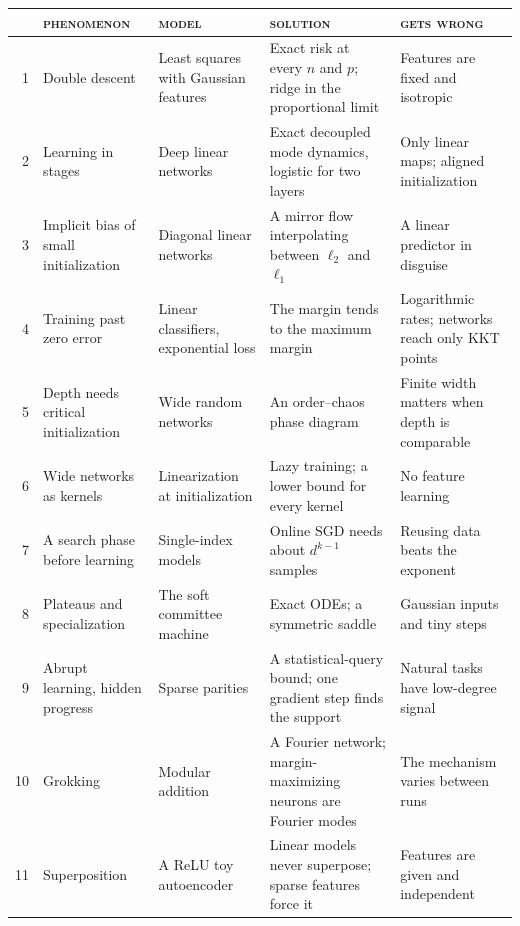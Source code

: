 \begin{refsection}
\begin{table}[p]
\begin{fullwidth}
\centering\small
\renewcommand{\arraystretch}{1.18}
\begin{tabular}{@{}r>{\raggedright\arraybackslash}p{28mm}>{\raggedright\arraybackslash}p{33mm}>{\raggedright\arraybackslash}p{41mm}>{\raggedright\arraybackslash}p{38mm}@{}}
\toprule
& \textsc{phenomenon} & \textsc{model} & \textsc{solution} & \textsc{gets wrong}\\
\midrule
1 & Double descent & Least squares with Gaussian features & Exact risk at every $n$ and $p$; ridge in the proportional limit & Features are fixed and isotropic\\
2 & Learning in stages & Deep linear networks & Exact decoupled mode dynamics, logistic for two layers & Only linear maps; aligned initialization\\
3 & Implicit bias of small initialization & Diagonal linear networks & A mirror flow interpolating between $\ell_2$ and $\ell_1$ & A linear predictor in disguise\\
4 & Training past zero error & Linear classifiers, exponential loss & The margin tends to the maximum margin & Logarithmic rates; networks reach only KKT points\\
\midrule
5 & Depth needs critical initialization & Wide random networks & An order--chaos phase diagram & Finite width matters when depth is comparable\\
6 & Wide networks as kernels & Linearization at initialization & Lazy training; a lower bound for every kernel & No feature learning\\
\midrule
7 & A search phase before learning & Single-index models & Online SGD needs about $d^{k-1}$ samples & Reusing data beats the exponent\\
8 & Plateaus and specialization & The soft committee machine & Exact ODEs; a symmetric saddle & Gaussian inputs and tiny steps\\
9 & Abrupt learning, hidden progress & Sparse parities & A statistical-query bound; one gradient step finds the support & Natural tasks have low-degree signal\\
\midrule
10 & Grokking & Modular addition & A Fourier network; margin-maximizing neurons are Fourier modes & The mechanism varies between runs\\
11 & Superposition & A ReLU toy autoencoder & Linear models never superpose; sparse features force it & Features are given and independent\\

\end{tabular}
\end{fullwidth}
\end{table}
\end{refsection}
